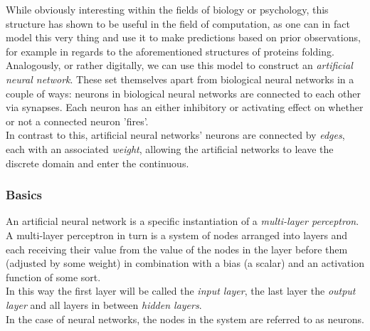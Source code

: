 \noindent While obviously interesting within the fields of biology or psychology, this structure has shown 
to be useful in the field of computation, as one can in fact model this very 
thing and use it to make predictions based on prior observations, for example in regards to the 
aforementioned structures of proteins folding.\\
Analogously, or rather digitally, we can use this model to construct an \textit{artificial 
neural network}.
These set themselves apart from biological neural networks in a couple of ways: neurons in biological neural networks are connected to each other via synapses. Each neuron has an either inhibitory or activating effect on whether or not a connected neuron 'fires'.\\
In contrast to this, artificial neural networks' neurons are connected by \textit{edges}, each with an associated \textit{weight}, allowing the artificial networks to leave the discrete domain and enter the continuous.

\subsubsection{Basics}
An artificial neural network is a specific instantiation of a \textit{multi-layer perceptron}.
A multi-layer perceptron in turn is a system of nodes arranged into layers and each receiving their value from the value of the nodes in the layer before them (adjusted by some weight) in combination with a bias (a scalar) and an activation function of some sort. \\
In this way the first layer will be called the \textit{input layer}, the last layer the \textit{output layer} and all layers in between \textit{hidden layers}. \\
In the case of neural networks, the nodes in the system are referred to as neurons.

